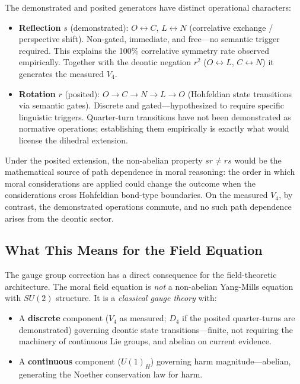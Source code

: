 \documentclass[12pt]{article}
\theoremstyle{definition}
\theoremstyle{remark}
\begin{document}
The demonstrated and posited generators have distinct operational characters:

\begin{itemize}
    \item \textbf{Reflection} $s$ (demonstrated): $O \leftrightarrow C$, $L \leftrightarrow N$ (correlative exchange / perspective shift). Non-gated, immediate, and free---no semantic trigger required. This explains the 100\% correlative symmetry rate observed empirically. Together with the deontic negation $r^2$ ($O \leftrightarrow L$, $C \leftrightarrow N$) it generates the measured $V_4$.
    \item \textbf{Rotation} $r$ (posited): $O \to C \to N \to L \to O$ (Hohfeldian state transitions via semantic gates). Discrete and gated---hypothesized to require specific linguistic triggers. Quarter-turn transitions have not been demonstrated as normative operations; establishing them empirically is exactly what would license the dihedral extension.
\end{itemize}

Under the posited extension, the non-abelian property $sr \neq rs$ would be the mathematical source of path dependence in moral reasoning: the order in which moral considerations are applied could change the outcome when the considerations cross Hohfeldian bond-type boundaries. On the measured $V_4$, by contrast, the demonstrated operations commute, and no such path dependence arises from the deontic sector.

\subsection{What This Means for the Field Equation}

The gauge group correction has a direct consequence for the field-theoretic architecture. The moral field equation is \emph{not} a non-abelian Yang-Mills equation with $SU(2)$ structure. It is a \emph{classical gauge theory} with:

\begin{itemize}
    \item A \textbf{discrete} component ($V_4$ as measured; $D_4$ if the posited quarter-turns are demonstrated) governing deontic state transitions---finite, not requiring the machinery of continuous Lie groups, and abelian on current evidence.
    \item A \textbf{continuous} component ($U(1)_H$) governing harm magnitude---abelian, generating the Noether conservation law for harm.
\end{itemize}
\end{document}
